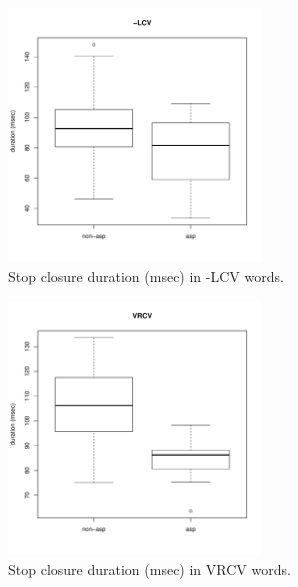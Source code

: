 \documentclass[11pt,a4paper,openany]{memoir}\usepackage[]{graphicx}\usepackage[]{color}
\newenvironment{knitrout}{}{} %
\begin{document}
\begin{figure}
\centering
\begin{knitrout}
\color{fgcolor}
\includegraphics[width=0.6\textwidth]{img/di-lat-clos-box-1} 

\end{knitrout}
\caption{Stop closure duration (msec) in -LCV words.}
\label{f:dilatclos}
\end{figure}

\begin{figure}
\centering
\begin{knitrout}
\color{fgcolor}
\includegraphics[width=0.6\textwidth]{img/di-rho-clos-box-1} 

\end{knitrout}
\caption{Stop closure duration (msec) in VRCV words.}
\label{f:dirhoclos}
\end{figure}
\end{document}
